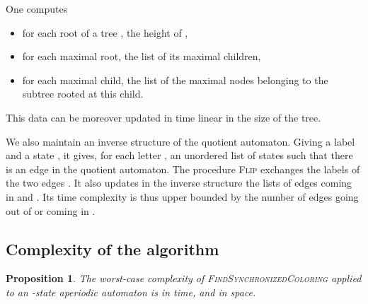 \documentclass[11pt,a4paper]{article}
\newtheorem{proposition}[theorem]{Proposition}
\begin{document}
One computes 
\begin{itemize}
\item for each root of a tree , the height of ,
\item for each maximal root, the list of its maximal children,
\item for each maximal child, the list of the maximal nodes belonging
  to the subtree rooted at this child.
\end{itemize}
This data can be moreover updated in time linear in the size of the
tree.

We also maintain an inverse structure of the quotient
automaton. Giving a label  and a state , it gives, for each
letter , an unordered list of states  such that there is an edge
 in the quotient automaton. The procedure
\textsc{Flip} exchanges the labels of the two edges
. It also updates in the inverse structure the
lists of edges coming in  and . Its time complexity is thus
upper bounded by the number of edges going out of  or coming in
.


\subsection{Complexity of the algorithm} 

\begin{proposition} \label{proposition.complexity}
The worst-case complexity of \textsc{FindSynchronizedColoring}
applied to an -state aperiodic automaton is 
in time, and  in space.
\end{proposition}
\end{document}
